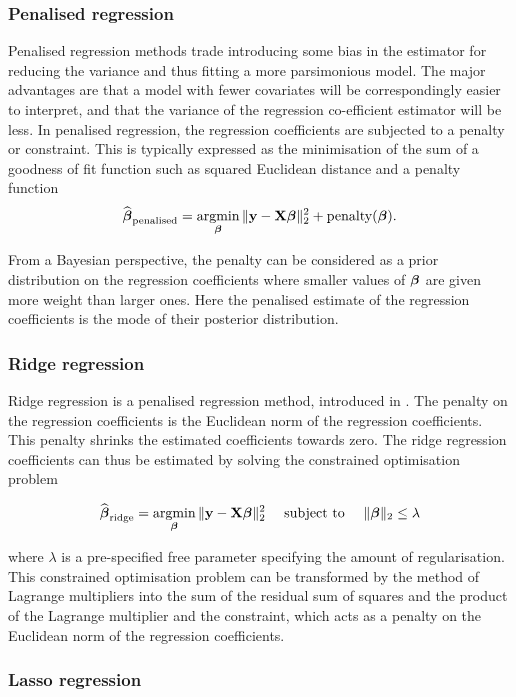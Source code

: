 \subsubsection{Penalised regression}

Penalised regression methods trade introducing some bias in the estimator for
reducing the variance and thus fitting a more parsimonious model. The major
advantages are that a model with fewer covariates will be correspondingly
easier to interpret, and that the variance of the regression co-efficient
estimator will be less. In penalised regression, the regression coefficients
are subjected to a penalty or constraint. This is typically expressed as the
minimisation of the sum of a goodness of fit function such as squared Euclidean
distance and a penalty function $$ \widehat{\vbeta}_{\text{penalised}} =
\argmin_\vbeta \|\vy - \mX \vbeta\|_2^2 + \text{penalty}(\vbeta).  $$

From a Bayesian perspective, the penalty can be considered as a prior
distribution on the regression coefficients where smaller values of ${\boldsymbol \beta}$ are
given more weight than larger ones. Here the penalised estimate of the
regression coefficients is the mode of their posterior distribution.

\subsubsection{Ridge regression}

Ridge regression is a penalised regression method, introduced in
\cite{Hoerl1970}. The penalty on the regression coefficients is the Euclidean
norm of the regression coefficients. This penalty shrinks the estimated
coefficients towards zero. The ridge regression coefficients can thus be
estimated by solving the constrained optimisation problem

$$
\widehat{\vbeta}_{\text{ridge}} = \argmin_\vbeta \|\vy - \mX \vbeta\|_2^2 \quad \text{ subject to } \quad \|\vbeta\|_2 \leq \lambda
$$

\noindent 
where $\lambda$ is a pre-specified free parameter specifying the amount of
regularisation. This constrained optimisation problem can be transformed by the
method of Lagrange multipliers into the sum of the residual sum of squares and
the product of the Lagrange multiplier and the constraint, which acts as a
penalty on the Euclidean norm of the regression coefficients.


\subsubsection{Lasso regression}

